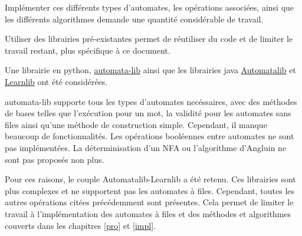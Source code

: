 Implémenter ces différents types d'automates, les opérations associées, ainsi que les différents algorithmes demande une quantité considérable de travail.

Utiliser des librairies pré-existantes permet de réutiliser du code et de limiter le travail restant, plus spécifique à ce document.

Une librairie en python, \href{https://pypi.org/project/automata-lib/}{automata-lib} ainsi que les librairies java \href{https://learnlib.de/projects/automatalib/}{Automatalib} et \href{https://learnlib.de/}{Learnlib} ont été considérées.

automata-lib supporte tous les types d'automates necéssaires, avec des méthodes de bases telles que l'exécution pour un mot, la validité pour les automates sans files ainsi qu'une méthode de construction simple. Cependant, il manque beaucoup de fonctionnalités. Les opérations booléennes entre automates ne sont pas implémentées. La déterminisation d'un NFA ou l'algorithme d'Angluin ne sont pas proposés non plus.

Pour ces raisons, le couple Automatalib-Learnlib a été retenu. Ces librairies sont plus complexes et ne supportent pas les automates à files. Cependant, toutes les autres opérations citées précédemment sont présentes. Cela permet de limiter le travail à l'implémentation des automates à files et des méthodes et algorithmes couverts dans les chapitres \ref{pro} et \ref{impl}.
